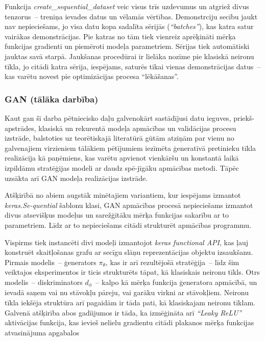 \documentclass[12pt, a4paper]{article}
\numberwithin{equation}{section} %
\begin{document}
Funkcija \textit{create\_sequential\_dataset} veic visus trīs uzdevumus un atgriež divus tenzorus~-- treniņa ievades datus un vēlamās vērtības. Demonstrciju secību jaukt nav nepieciešams, jo visa datu kopa sadalīta sērijās (\textit{``batches''}), kas katra satur vairākas demonstrācijas. Pie katras no tām tiek vienreiz aprēķināti mērķa funkcijas gradienti un piemēroti modeļa parametriem. Sērijas tiek automātiski jauktas savā starpā. Jaukšanas procedūrai ir lielāka nozīme pie klasiskā neironu tīkla, jo citādi katra sērija, iespējams, saturēs tikai vienas demonstrācijas datus~-- kas varētu novest pie optimizācijas procesa ``lēkāšanas''.

\subsubsection{GAN (tālāka darbība)}

Kaut gan šī darba pētniecisko daļu galvenokārt sastādījusi datu ieguves, priekš-apstrādes, klasiskā un rekurentā modeļa apmācības un validācijas procesu izstrāde, balstoties uz teorētiskajā literatūrā gūtām atziņām par vienu no galvenajiem virzieniem tālākiem pētījumiem iezīmēta ģeneratīvā pretinieku tīkla realizācija kā paņēmiens, kas varētu apvienot vienkāršu un konstantā laikā izpildāmu stratēģijas modeli ar daudz spē-jīgāku apmācības metodi. Tāpēc uzsākta arī GAN modeļa realizācijas izstrāde.

Atšķirībā no abiem augstāk minētajiem variantiem, kur iespējams izmantot \textit{keras.Se-quential} šablonu klasi, GAN apmācības procesā nepieciešams izmantot divus atsevišķus modeļus un sarežģītāku mērķa funkcijas sakarību ar to parametriem. Līdz ar to nepieciešams citādi strukturēt apmācības programmu. 

Vispirms tiek instancēti divi modeļi izmantojot \textit{keras functional API}, kas ļauj konstruēt skaitļošanas grafu ar secīgu slāņu reprezentācijas objektu izsaukšanu. Pirmais modelis~-- ģenerators $\pi_{\theta}$, kas ir arī rezultējošā stratēģija~-- līdz šim veiktajos eksperimentos ir ticis strukturēts tāpat, kā klasiskais neironu tīkls. Otrs modelis~-- diskriminators $d_{\phi}$~-- kalpo kā mērķa funkcija ģeneratora apmācībā, un ievadā saņem vai nu stāvokļu pāreju, vai garāku virkni ar stāvokļiem. Neironu tīkla iekšēja struktūra arī pagaidām ir tāda pati, kā klasiskajam neironu tīklam. Galvenā atšķirība abos gadīijumos ir tāda, ka izmēģināta arī \textit{``Leaky ReLU''} aktivācijas funkcija, kas ievieš nelielu gradientu citādi plakanos mērķa funkcijas atvasinājuma apgabalos
\end{document}
